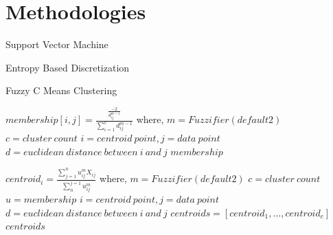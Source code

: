 \documentclass[12pt,a4paper,final]{report}
\begin{document}
\section{Methodologies}
\begin{algorithm}
\caption{Support Vector Machine}
\begin{algorithmic}[1]
\State
\end{algorithmic}
\end{algorithm}

\begin{algorithm}
\caption{Entropy Based Discretization}
\begin{algorithmic}[1]
\State
\end{algorithmic}
\end{algorithm}

\begin{algorithm}
\caption{Fuzzy C Means Clustering}
\begin{algorithmic}[1]
\State $membership[i,j] = \frac{\frac{-2}{d_{ij}^{m-1}}}{\sum_{i=1}^{c}{{d_{ij}^{m-1}}}}$
\newline
\hspace*{1cm}
where, 
\newline
\hspace*{1cm}
$m = Fuzzifier (default 2)$
\newline
\hspace*{1cm}
$c = cluster\ count$
\newline
\hspace*{1cm}
$i = centroid\ point, j = data\ point$
\newline
\hspace*{1cm}
$d = euclidean\ distance\ between\ i\ and\ j$
\State \Return $membership$
\EndFunction

\State $centroid_{i} = \frac{\sum_{j=1}^{n}u_{ij}^{m}X_{ij}}{\sum_{n}^{j=1}u_{ij}^{m}}$
\newline
\hspace*{1cm}
where, 
\newline
\hspace*{1cm}
$m = Fuzzifier (default 2)$
\newline
\hspace*{1cm}
$c = cluster\ count$
\newline
\hspace*{1cm}
$u = membership$
\newline
\hspace*{1cm}
$i = centroid\ point, j = data\ point$
\newline
\hspace*{1cm}
$d = euclidean\ distance\ between\ i\ and\ j$
\State $centroids = [ centroid_1, \ldots, centroid_c ]$
\State \Return $centroids$
\EndFunction


\end{algorithmic}
\end{algorithm}
\end{document}

